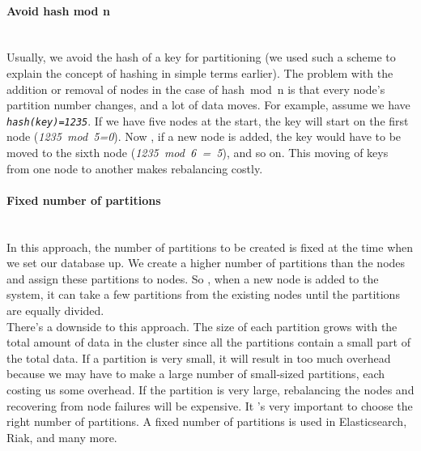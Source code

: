 \paragraph{Avoid hash mod n}\label{fgv6Ne037aPJzAbwN6G54}
\\
Usually, we avoid the hash of a key for partitioning (we used such a scheme to explain the concept of hashing in simple terms earlier). The problem with the addition or removal of nodes in the case of hash\ mod\ n is that every node's partition number changes, and a lot of data moves. For example, assume we have \emph{\texttt{hash(key)=1235}}. If we have five nodes at the start, the key will start on the first node (\emph{1235\ mod\ 5=0}). Now , if a new node is added, the key would have to be moved to the sixth node (\emph{1235\ mod\ 6\ =\ 5}), and so on. This moving of keys from one node to another makes rebalancing costly.
\\
\paragraph{Fixed number of partitions}\label{iUVjvg9QjhR72jJn3lcGX}
\\
In this approach, the number of partitions to be created is fixed at the time when we set our database up. We create a higher number of partitions than the nodes and assign these partitions to nodes. So , when a new node is added to the system, it can take a few partitions from the existing nodes until the partitions are equally divided.
\\
There's a downside to this approach. The size of each partition grows with the total amount of data in the cluster since all the partitions contain a small part of the total data. If a partition is very small, it will result in too much overhead because we may have to make a large number of small-sized partitions, each costing us some overhead. If the partition is very large, rebalancing the nodes and recovering from node failures will be expensive. It 's very important to choose the right number of partitions. A fixed number of partitions is used in Elasticsearch, Riak, and many more.
\\
